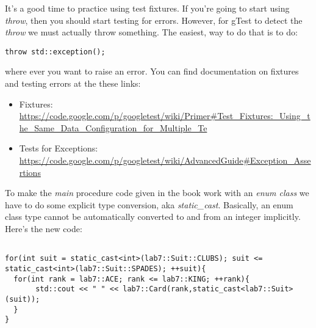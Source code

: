 \documentclass[10pt]{article}
\begin{document}
It's a good time to practice using test fixtures.  If you're going to start using \textit{throw}, then you should start testing for errors.  However, for gTest to detect the \textit{throw} we must actually throw something. The easiest, way to do that is to do:
\begin{verbatim}
throw std::exception();
\end{verbatim}
where ever you want to raise an error. You can find documentation on fixtures and testing errors at the these links:
\begin{itemize}
\item Fixtures: \scriptsize{\url{https://code.google.com/p/googletest/wiki/Primer#Test_Fixtures:_Using_the_Same_Data_Configuration_for_Multiple_Te}}
\item Tests for Exceptions: \scriptsize{\url{https://code.google.com/p/googletest/wiki/AdvancedGuide#Exception_Assertions}}
\end{itemize}

To make the \textit{main} procedure code given in the book work with an \textit{enum class} we have to do some explicit type conversion, aka \textit{static\_cast}. Basically, an enum class type cannot be automatically converted to and from an integer implicitly. Here's the new code:
\begin{verbatim}

for(int suit = static_cast<int>(lab7::Suit::CLUBS); suit <= static_cast<int>(lab7::Suit::SPADES); ++suit){
  for(int rank = lab7::ACE; rank <= lab7::KING; ++rank){
       std::cout << " " << lab7::Card(rank,static_cast<lab7::Suit>(suit));
  }
}
\end{verbatim}
\end{document}

